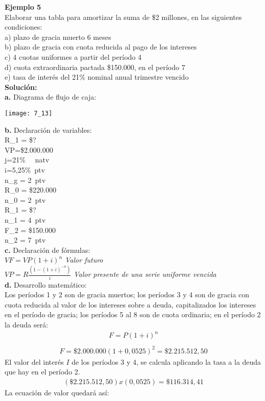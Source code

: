 \textbf{Ejemplo 5}\\
Elaborar una tabla para amortizar la suma de \$2 millones, en las siguientes condiciones:\\
a)	plazo de gracia muerto 6 meses\\
b)	plazo de gracia con cuota reducida al pago de los intereses \\
c)	4 cuotas uniformes a partir del período 4\\
d)	cuota extraordinaria pactada \$150.000, en el período 7\\
e)	tasa de interés del 21\% nominal anual trimestre vencido\\

\textbf{Solución:}\\
\textbf{a.}	Diagrama de flujo de caja:
\begin{center}
	\texttt{[image: 7\_13]}
\end{center}
\textbf{b.} Declaración de variables:\\


	R_{1}  = \$?\\
	VP=\$2.000.000\\
	j=21\%  \ \ natv\\
	i=5,25\%\ ptv\\
	n_{g} = 2\ ptv\\
	R_{0} = \$220.000\\
	n_{0} = 2\ ptv \\
	R_{1} = \$?\ \\
	n_{1} = 4\ ptv\\
	F_{2} = \$150.000\ \\
	n_{2} = 7\ ptv\\
	

\textbf{c.}	Declaración de fórmulas:\\


	$VF=VP(1+i)^{n}$ \hspace{35 pt} \textit{Valor futuro}\\
	$VP=R \frac{(1-(1+i)^{-n})}{i}$ \hspace{35 ptv} \textit{Valor presente de una serie uniforme vencida}\\
	

\textbf{d.}	Desarrollo matemático:\\
Los períodos 1 y 2 son de gracia muertos; los períodos 3 y 4 son de gracia con cuota reducida al valor de los intereses sobre a deuda, capitalizados los intereses en el período de gracia; los períodos 5 al 8 son de cuota ordinaria; en el período 2 la deuda será:
\begin{align*}
	F=P(1+i)^{n}\\
	
\end{align*}
\begin{align*}
	F = \$ 2.000.000 (1+0,0525)^{2}=\$ 2.215.512,50
\end{align*}
El valor del interés $I$ de los períodos 3 y 4, se calcula aplicando la tasa a la deuda que hay en el período 2.
\begin{align*}
	(\$ 2.215.512,50) x (0,0525)=\$ 116.314,41
\end{align*}
La ecuación de valor quedará así:\\



